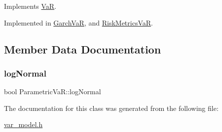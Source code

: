 Implements \hyperlink{classVaR_a1bd868d9953bfaeb49f5bf7d16986631}{VaR}.



Implemented in \hyperlink{classGarchVaR_ac6d01b6567a6d0629cd95be716677763}{Garch\+VaR}, and \hyperlink{classRiskMetricsVaR_a3e79a82675a93c7467451146131a2ec5}{Risk\+Metrics\+VaR}.



\subsection{Member Data Documentation}
\hypertarget{classParametricVaR_a6e1dd396274079af9e1fc21068213866}{}\label{classParametricVaR_a6e1dd396274079af9e1fc21068213866} 
\subsubsection{\texorpdfstring{log\+Normal}{logNormal}}
{\footnotesize\ttfamily bool Parametric\+Va\+R\+::log\+Normal\hspace{0.3cm}{\ttfamily [protected]}}



The documentation for this class was generated from the following file\+:\begin{DoxyCompactItemize}
\item 
\hyperlink{var__model_8h}{var\+\_\+model.\+h}\end{DoxyCompactItemize}
